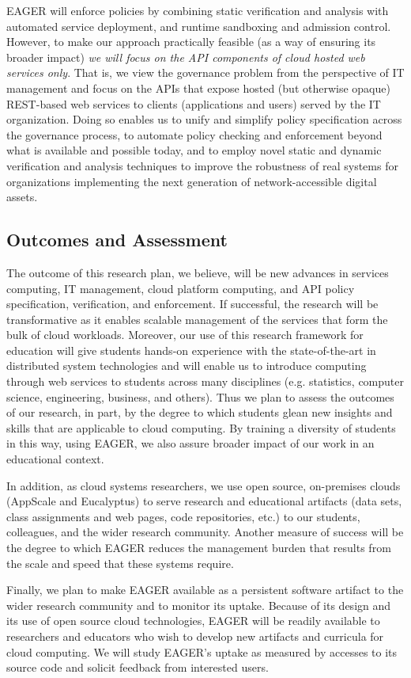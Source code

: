 \documentclass[10pt]{article}
\begin{document}
EAGER will enforce policies by combining
static verification and analysis with automated
service deployment, and runtime
sandboxing and admission control.  However, to make our approach practically
feasible (as a way of ensuring its broader impact) {\em we will focus on
the API components of cloud hosted web services only}.  That is, we view the
governance problem from the perspective of IT management and focus on the APIs
that expose hosted (but otherwise opaque) REST-based web services to clients
(applications and users) served by the IT organization.
Doing so enables us to unify and simplify policy specification across the 
governance process, to automate policy checking and enforcement beyond what 
is available
and possible today, and to employ novel static and dynamic verification and
analysis techniques to improve the robustness of real systems for
organizations implementing the next generation of network-accessible digital
assets.


\subsection{Outcomes and Assessment}

The outcome of this research plan,
we believe, will be new advances in services computing, IT management, cloud
platform computing, and API policy specification,  verification, and  enforcement.
If successful, the research will be transformative as it
enables scalable management of the services that form the
bulk of cloud workloads.
Moreover, our use of this research framework for
education will give students hands-on experience with the
state-of-the-art in distributed system technologies and will enable us to
introduce computing through web services to students across many disciplines
(e.g. statistics, computer science, engineering, business, and others).
Thus we plan to assess the outcomes of our research, in part, by the degree
to which students glean new insights and skills that are applicable to cloud
computing.  By training a diversity of  students in this way, using EAGER, we 
also assure broader impact of our work in an educational context.

In addition,
as cloud systems researchers, we use open source, on-premises clouds (AppScale
and Eucalyptus) to serve research and educational artifacts (data sets, class
assignments and web pages, code repositories, etc.) to our students,
colleagues, and the wider research community.  Another measure of success will
be the degree to which EAGER reduces the management burden that results from
the scale and speed that these systems require.

Finally, we plan to make EAGER available as a persistent software artifact to
the wider research community and to monitor its uptake.  Because of its design
and its use of open source cloud technologies, EAGER will be readily available
to researchers and educators who wish to develop new artifacts and curricula
for cloud computing.  We will study EAGER's uptake as measured by accesses to
its source code and solicit feedback from interested users.
\end{document}

